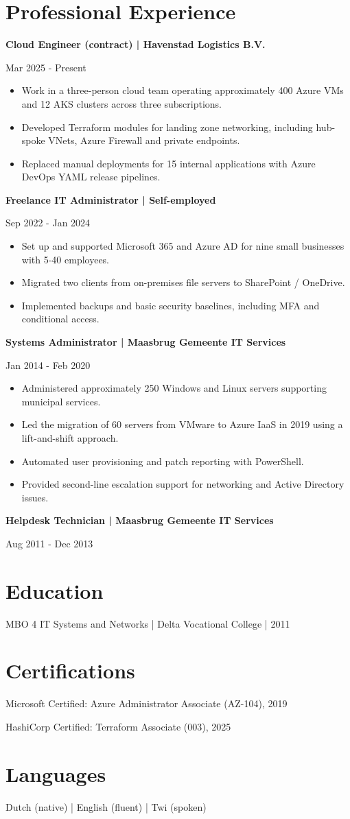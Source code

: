 \documentclass[10pt,a4paper]{article}
\newcommand{\cvsection}[1]{\section*{#1}}
\newcommand{\cvrole}[2]{\textbf{#1}\par #2\par}
\begin{document}
\cvsection{Professional Experience}
\cvrole{Cloud Engineer (contract) | Havenstad Logistics B.V.}{Mar 2025 - Present}
\begin{itemize}
\item Work in a three-person cloud team operating approximately 400 Azure VMs and 12 AKS clusters across three subscriptions.
\item Developed Terraform modules for landing zone networking, including hub-spoke VNets, Azure Firewall and private endpoints.
\item Replaced manual deployments for 15 internal applications with Azure DevOps YAML release pipelines.
\end{itemize}
\cvrole{Freelance IT Administrator | Self-employed}{Sep 2022 - Jan 2024}
\begin{itemize}
\item Set up and supported Microsoft 365 and Azure AD for nine small businesses with 5-40 employees.
\item Migrated two clients from on-premises file servers to SharePoint / OneDrive.
\item Implemented backups and basic security baselines, including MFA and conditional access.
\end{itemize}
\cvrole{Systems Administrator | Maasbrug Gemeente IT Services}{Jan 2014 - Feb 2020}
\begin{itemize}
\item Administered approximately 250 Windows and Linux servers supporting municipal services.
\item Led the migration of 60 servers from VMware to Azure IaaS in 2019 using a lift-and-shift approach.
\item Automated user provisioning and patch reporting with PowerShell.
\item Provided second-line escalation support for networking and Active Directory issues.
\end{itemize}
\cvrole{Helpdesk Technician | Maasbrug Gemeente IT Services}{Aug 2011 - Dec 2013}

\cvsection{Education}
MBO 4 IT Systems and Networks | Delta Vocational College | 2011

\cvsection{Certifications}
Microsoft Certified: Azure Administrator Associate (AZ-104), 2019\par
HashiCorp Certified: Terraform Associate (003), 2025

\cvsection{Languages}
Dutch (native) | English (fluent) | Twi (spoken)
\end{document}
